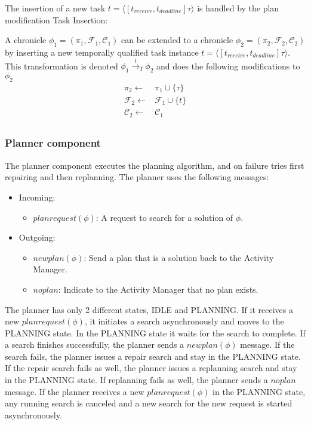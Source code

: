 The insertion of a new task $t = \langle[t_{receive},t_{deadline}] \tau\rangle$ is handled by the plan modification Task Insertion:

\begin{definition}
    A chronicle $\phi_1 = (\pi_1,\mathcal{F}_1,\mathcal{C}_1)$ can be extended to a chronicle $\phi_2 = (\pi_2,\mathcal{F}_2,\mathcal{C}_2)$ by inserting a new temporally qualified task instance $t = \langle[t_{receive},t_{deadline}] \tau\rangle$. This transformation is denoted $\phi_1 \xrightarrow{t}_I \phi_2$ and does the following modifications to $\phi_2$
  \begin{align*}
    \pi_2 \leftarrow & \pi_1 \cup \{\tau\} \\
    \mathcal{F}_2 \leftarrow & \mathcal{F}_1 \cup \{t\} \\
    \mathcal{C}_2 \leftarrow & \mathcal{C}_1 \\
  \end{align*}
\end{definition}

\subsubsection{Planner component}

The planner component executes the planning algorithm, and on failure tries first repairing and then replanning.
The planner uses the following messages:

\begin{itemize}
    \item Incoming:
    \begin{itemize}
        \item $planrequest(\phi)$: A request to search for a solution of $\phi$.
    \end{itemize}
    \item Outgoing:
    \begin{itemize}
        \item $newplan(\phi)$: Send a plan that is a solution back to the Activity Manager.
        \item $noplan$: Indicate to the Activity Manager that no plan exists.
    \end{itemize}
\end{itemize}

The planner has only 2 different states, IDLE and PLANNING.
If it receives a new $planrequest(\phi)$, it initiates a search asynchronously and moves to the PLANNING state.
In the PLANNING state it waits for the search to complete.
If a search finishes successfully, the planner sends a $newplan(\phi)$ message.
If the search fails, the planner issues a repair search and stay in the PLANNING state.
If the repair search fails as well, the planner issues a replanning search and stay in the PLANNING state.
If replanning fails as well, the planner sends a $noplan$ message.
If the planner receives a new $planrequest(\phi)$ in the PLANNING state, any running search is canceled and a new search for the new request is started asynchronously.

